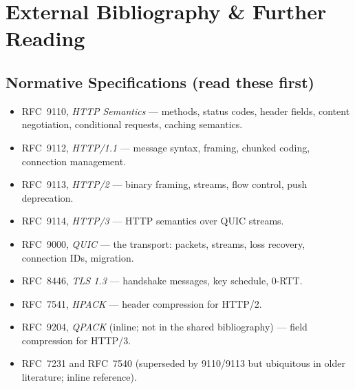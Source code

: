 \section{External Bibliography \& Further Reading}

\subsection*{Normative Specifications (read these first)}
\begin{itemize}
  \item RFC~9110, \emph{HTTP Semantics} \cite{rfc9110} --- methods, status codes, header fields, content negotiation, conditional requests, caching semantics.
  \item RFC~9112, \emph{HTTP/1.1} \cite{rfc9112} --- message syntax, framing, chunked coding, connection management.
  \item RFC~9113, \emph{HTTP/2} \cite{rfc9113} --- binary framing, streams, flow control, push deprecation.
  \item RFC~9114, \emph{HTTP/3} \cite{rfc9114} --- HTTP semantics over QUIC streams.
  \item RFC~9000, \emph{QUIC} \cite{rfc9000} --- the transport: packets, streams, loss recovery, connection IDs, migration.
  \item RFC~8446, \emph{TLS 1.3} \cite{rfc8446} --- handshake messages, key schedule, 0-RTT.
  \item RFC~7541, \emph{HPACK} \cite{rfc7541} --- header compression for HTTP/2.
  \item RFC~9204, \emph{QPACK} (inline; not in the shared bibliography) --- field compression for HTTP/3.
  \item RFC~7231 and RFC~7540 (superseded by 9110/9113 but ubiquitous in older literature; inline reference).
\end{itemize}

